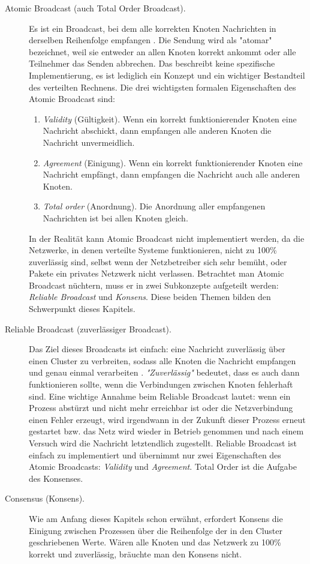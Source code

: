 \begin{description}
	\item[Atomic Broadcast (auch Total Order Broadcast).] Es ist ein Broadcast, bei dem alle korrekten Knoten Nachrichten in derselben Reihenfolge empfangen \cite{Défago04totalorder}. Die Sendung wird als "atomar" bezeichnet, weil sie entweder an allen Knoten korrekt ankommt oder alle Teilnehmer das Senden abbrechen. Das beschreibt keine spezifische Implementierung, es ist lediglich ein Konzept und ein wichtiger Bestandteil des verteilten Rechnens. Die drei wichtigsten formalen Eigenschaften des Atomic Broadcast sind:
	
	\begin{enumerate}
		\item \textit{Validity} (Gültigkeit). Wenn ein korrekt funktionierender Knoten eine Nachricht abschickt, dann empfangen alle anderen Knoten die Nachricht unvermeidlich.
		
		\item \textit{Agreement} (Einigung). Wenn ein korrekt funktionierender Knoten eine Nachricht empfängt, dann empfangen die Nachricht auch alle anderen Knoten.
		
		\item \textit{Total order} (Anordnung). Die Anordnung aller empfangenen Nachrichten ist bei allen Knoten gleich.
	\end{enumerate}
	
	In der Realität kann Atomic Broadcast nicht implementiert werden, da die Netzwerke, in denen verteilte Systeme funktionieren, nicht zu 100\% zuverlässig sind, selbst wenn der Netzbetreiber sich sehr bemüht, oder Pakete ein privates Netzwerk nicht verlassen. Betrachtet man Atomic Broadcast nüchtern, muss er in zwei Subkonzepte aufgeteilt werden: \textit{Reliable Broadcast} und \textit{Konsens}. Diese beiden Themen bilden den Schwerpunkt dieses Kapitels.
	
	\item[Reliable Broadcast (zuverlässiger Broadcast).] Das Ziel dieses Broadcasts ist einfach: eine Nachricht zuverlässig über einen Cluster zu verbreiten, sodass alle Knoten die Nachricht empfangen und genau einmal verarbeiten \cite{Défago04totalorder}. \textit{"Zuverlässig"} bedeutet, dass es auch dann funktionieren sollte, wenn die Verbindungen zwischen Knoten fehlerhaft sind. Eine wichtige Annahme beim Reliable Broadcast lautet: wenn ein Prozess abstürzt und nicht mehr erreichbar ist oder die Netzverbindung einen Fehler erzeugt, wird irgendwann in der Zukunft dieser Prozess erneut gestartet bzw. das Netz wird wieder in Betrieb genommen und nach einem Versuch wird die Nachricht letztendlich zugestellt. Reliable Broadcast ist einfach zu implementiert und übernimmt nur zwei Eigenschaften des Atomic Broadcasts: \textit{Validity} und \textit{Agreement}. Total Order ist die Aufgabe des Konsenses.
	
	\item[Consensus (Konsens).] Wie am Anfang dieses Kapitels schon erwähnt, erfordert Konsens die Einigung zwischen Prozessen über die Reihenfolge der in den Cluster geschriebenen Werte. Wären alle Knoten und das Netzwerk zu 100\% korrekt und zuverlässig, bräuchte man den Konsens nicht.
\end{description}

